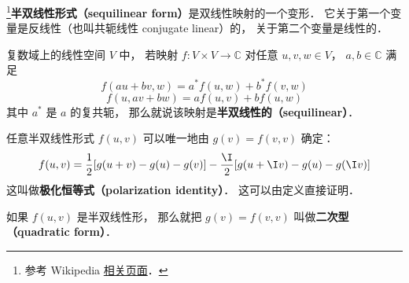 
\begin{issues}
\issueDraft
\end{issues}

\footnote{参考 Wikipedia \href{https://en.wikipedia.org/wiki/Sesquilinear_form}{相关页面}．}\textbf{半双线性形式（sequilinear form）}是双线性映射的一个变形． 它关于第一个变量是反线性（也叫共轭线性 conjugate linear）的， 关于第二个变量是线性的．
\begin{definition}{}
复数域上的线性空间 $V$ 中， 若映射 $f:V\times V\to \mathbb C$ 对任意 $u, v, w\in V$， $a,b\in \mathbb C$ 满足
\begin{equation}\label{sequil_eq2}
f(au+bv, w) = a^*f(u, w) + b^*f(v, w)
\end{equation}
\begin{equation}\label{sequil_eq1}
f(u, av+bw) = af(u, v) + bf(u, w)
\end{equation}
其中 $a^*$ 是 $a$ 的复共轭， 那么就说该映射是\textbf{半双线性的（sequilinear）}．
\end{definition}

任意半双线性形式 $f(u, v)$ 可以唯一地由 $g(v) = f(v, v)$ 确定：
\begin{equation}
f(u, v) =\frac{1}{2}[g(u+v)-g(u)-g(v)]
-\frac{\I}{2}[g(u+\I v)-g(u)-g(\I v)]
\end{equation}
这叫做\textbf{极化恒等式（polarization identity）}． 这可以由定义直接证明．

如果 $f(u, v)$ 是半双线性形， 那么就把 $g(v) = f(v, v)$ 叫做\textbf{二次型（quadratic form）}．
